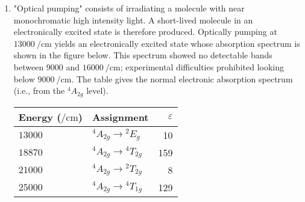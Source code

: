 \documentclass[../psets.tex]{subfiles}
\begin{document}
\begin{enumerate}[label={\Roman*)}]
\begin{proof}[Answer]
\begin{align*}
            \Gamma_2 &= T_{2g}\\
            \Gamma_\mu &= T_{1u}\\
            \Gamma_1 &= A_{1g}\\
            \Gamma_\text{gv} &= A_{1g}
        \end{align*}
        As before, the product of the right four terms is
        \begin{align*}
            \Gamma_2\otimes\Gamma_\mu\otimes\Gamma_1\otimes\Gamma_\text{gv} &= T_{2g}\otimes T_{1u}\otimes A_{1g}\otimes A_{1g}\\
            &= T_{2g}\otimes T_{1u}\\
            &= A_{2u}+E_u+T_{1u}+T_{2u}
        \end{align*}
        By Theorem 2, the direct product of the above and any of $A_{1g}$, $E_g$, and $T_{2g}$ does not contain the totally symmetric representation, but the direct product of the above and any of $T_{1u}$ and $T_{2u}$ does. Therefore, the ${}^1A_{1g}\to{}^1T_{2g}$ transition is vibronically allowed.
    \end{proof}
    \newpage
    \item "Optical pumping" consists of irradiating a molecule with near monochromatic high intensity light. A short-lived molecule in an electronically excited state is therefore produced. Optically pumping  at $\SI{13000}{\per\centi\meter}$ yields an electronically excited state whose absorption spectrum is shown in the figure below. This spectrum showed no detectable bands between $\num{9000}$ and $\SI{16000}{\per\centi\meter}$; experimental difficulties prohibited looking below $\SI{9000}{\per\centi\meter}$. The table gives the normal electronic absorption spectrum (i.e., from the ${}^4A_{2g}$ level).
    \begin{table}[h!]
        \centering
        \small
        \renewcommand{\arraystretch}{1.4}
        \begin{tabular}{llr}
            \hline
            Energy ($\si{\per\centi\meter}$) & Assignment & $\varepsilon$\\
            \hline
            $\num{13000}$ & ${}^4A_{2g}\to{}^2E_g$               & 10\\
            $\num{18870}$ & ${}^4A_{2g}\to{}^4T_{2g}$            & 159\\
            $\num{21000}$ & ${}^4A_{2g}\to{}^2T_{2g}$            & 8\\
            $\num{25000}$ & ${}^4A_{2g}\to{}^4T_{1g}$            & 129\\

\end{tabular}
\end{table}
\end{enumerate}
\end{document}
